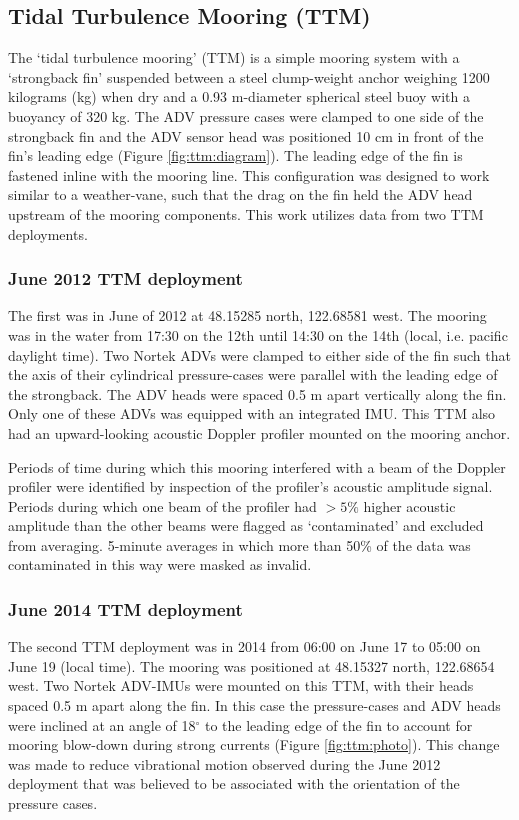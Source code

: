 \subsection{Tidal Turbulence Mooring (TTM)}

The `tidal turbulence mooring' (TTM) is a simple mooring system with a `strongback fin' suspended between a steel clump-weight anchor weighing 1200 kilograms (kg) when dry and a 0.93 m-diameter spherical steel buoy with a buoyancy of 320 kg. The ADV pressure cases were clamped to one side of the strongback fin and the ADV sensor head was positioned 10 cm in front of the fin's leading edge (Figure \ref{fig:ttm:diagram}). The leading edge of the fin is fastened inline with the mooring line. This configuration  was designed to work similar to a weather-vane, such that the drag on the fin held the ADV head upstream of the mooring components.  This work utilizes data from two TTM deployments. 

\subsubsection{June 2012 TTM deployment}

The first was in June of 2012 at 48.15285 north, 122.68581 west. The mooring was in the water from 17:30 on the 12th until 14:30 on the 14th (local, i.e. pacific daylight time). Two Nortek ADVs were clamped to either side of the fin such that the axis of their cylindrical pressure-cases were parallel with the leading edge of the strongback. The ADV heads were spaced 0.5 m apart vertically along the fin. Only one of these ADVs was equipped with an integrated IMU. This TTM also had an upward-looking acoustic Doppler profiler mounted on the mooring anchor.

Periods of time during which this mooring interfered with a beam of the Doppler profiler were identified by inspection of the profiler's acoustic amplitude signal. Periods during which one beam of the profiler had $>5\%$ higher acoustic amplitude than the other beams were flagged as `contaminated' and excluded from averaging.  5-minute averages in which more than 50\% of the data was contaminated in this way were masked as invalid.

\subsubsection{June 2014 TTM deployment}

The second TTM deployment was in 2014 from 06:00 on June 17 to 05:00 on June 19 (local time). The mooring was positioned at 48.15327 north, 122.68654 west.  Two Nortek ADV-IMUs were mounted on this TTM, with their heads spaced 0.5 m apart along the fin. In this case the pressure-cases and ADV heads were inclined at an angle of 18$^\circ$ to the leading edge of the fin to account for mooring blow-down during strong currents (Figure \ref{fig:ttm:photo}). This change was made to reduce vibrational motion observed during the June 2012 deployment that was believed to be associated with the orientation of the pressure cases.

